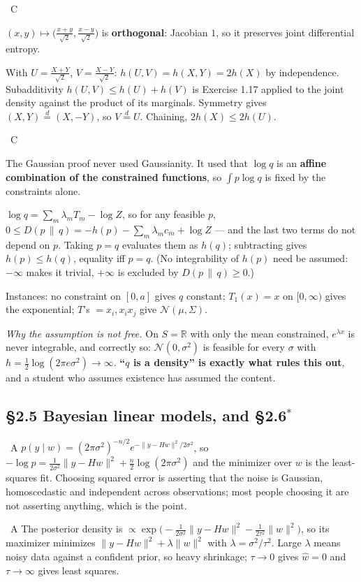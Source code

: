 \documentclass[10pt]{article}
\newcommand{\Q}[2]{\medskip\noindent{\color{acc}\textbf{#1}}\ {\scriptsize\color{grey}\textsc{#2}}\quad}
\newcommand{\R}{\mathbb{R}}
\newcommand{\Nor}{\mathcal{N}}
\newcommand{\KL}[2]{D(#1\,\|\,#2)}
\begin{document}
\Q{1.19}{C}
\begin{idea}
$(x,y)\mapsto\big(\tfrac{x+y}{\sqrt2},\tfrac{x-y}{\sqrt2}\big)$ is \textbf{orthogonal}: Jacobian $1$, so it preserves joint differential entropy.
\end{idea}
With $U=\tfrac{X+Y}{\sqrt2}$, $V=\tfrac{X-Y}{\sqrt2}$: $h(U,V)=h(X,Y)=2h(X)$ by independence. Subadditivity $h(U,V)\le h(U)+h(V)$ is Exercise 1.17 applied to the joint density against the product of its marginals. Symmetry gives $(X,Y)\overset{d}{=}(X,-Y)$, so $V\overset{d}{=}U$. Chaining, $2h(X)\le2h(U)$.

\Q{1.20}{C}
\begin{idea}
The Gaussian proof never used Gaussianity. It used that $\log q$ is an \textbf{affine combination of the constrained functions}, so $\int p\log q$ is fixed by the constraints alone.
\end{idea}
$\log q=\sum_m\lambda_mT_m-\log Z$, so for any feasible $p$, $0\le\KL{p}{q}=-h(p)-\sum_m\lambda_mc_m+\log Z$ --- and the last two terms do not depend on $p$. Taking $p=q$ evaluates them as $h(q)$; subtracting gives $h(p)\le h(q)$, equality iff $p=q$. (No integrability of $h(p)$ need be assumed: $-\infty$ makes it trivial, $+\infty$ is excluded by $\KL{p}{q}\ge0$.)

Instances: no constraint on $[0,a]$ gives $q$ constant; $T_1(x)=x$ on $[0,\infty)$ gives the exponential; $T$'s $=x_i,x_ix_j$ give $\Nor(\mu,\Sigma)$.

\emph{Why the assumption is not free.} On $S=\R$ with only the mean constrained, $e^{\lambda x}$ is never integrable, and correctly so: $\Nor(0,\sigma^2)$ is feasible for every $\sigma$ with $h=\tfrac12\log(2\pi e\sigma^2)\to\infty$. \textbf{``$q$ is a density'' is exactly what rules this out}, and a student who assumes existence has assumed the content.

\subsection{\S2.5 Bayesian linear models, and \S2.6$^\ast$}

\Q{2.9}{A} $p(y\mid w)=(2\pi\sigma^2)^{-n/2}e^{-\|y-Hw\|^2/2\sigma^2}$, so $-\log p=\frac{1}{2\sigma^2}\|y-Hw\|^2+\frac n2\log(2\pi\sigma^2)$ and the minimizer over $w$ is the least-squares fit. Choosing squared error is asserting that the noise is Gaussian, homoscedastic and independent across observations; most people choosing it are not asserting anything, which is the point.

\Q{2.10}{A} The posterior density is $\propto\exp\big(-\frac{1}{2\sigma^2}\|y-Hw\|^2-\frac{1}{2\tau^2}\|w\|^2\big)$, so its maximizer minimizes $\|y-Hw\|^2+\lambda\|w\|^2$ with $\lambda=\sigma^2/\tau^2$. Large $\lambda$ means noisy data against a confident prior, so heavy shrinkage; $\tau\to0$ gives $\widehat w=0$ and $\tau\to\infty$ gives least squares.
\end{document}
